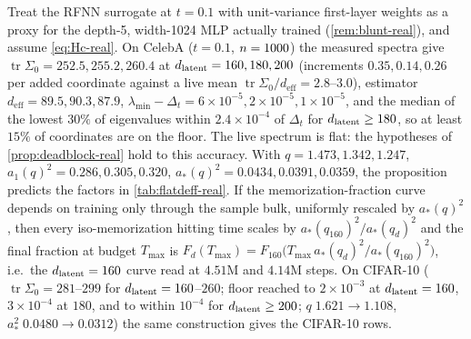 \begin{corollary}\label{cor:flatdeff-real}
Treat the RFNN surrogate at $t=0.1$ with unit-variance first-layer weights as a proxy for the depth-5, width-1024 MLP actually trained (\cref{rem:blunt-real}), and assume \eqref{eq:Hc-real}. On CelebA ($t=0.1$, $n=1000$) the measured spectra give $\operatorname{tr}\Sigma_0=252.5,255.2,260.4$ at $d_{\mathrm{latent}}=160,180,200$ (increments $0.35,0.14,0.26$ per added coordinate against a live mean $\operatorname{tr}\Sigma_0/d_{\mathrm{eff}}=2.8$--$3.0$), estimator $d_{\mathrm{eff}}=89.5,90.3,87.9$, $\lambda_{\min}-\Delta_t=6\times10^{-5},2\times10^{-5},1\times10^{-5}$, and the median of the lowest $30\%$ of eigenvalues within $2.4\times10^{-4}$ of $\Delta_t$ for $d_{\mathrm{latent}}\ge180$, so at least $15\%$ of coordinates are on the floor. The live spectrum is flat: the hypotheses of \cref{prop:deadblock-real} hold to this accuracy. With $q=1.473,1.342,1.247$, $a_1(q)^2=0.286,0.305,0.320$, $a_\ast(q)^2=0.0434,0.0391,0.0359$, the proposition predicts the factors in \cref{tab:flatdeff-real}. If the memorization-fraction curve depends on training only through the sample bulk, uniformly rescaled by $a_\ast(q)^2$, then every iso-memorization hitting time scales by $a_\ast(q_{160})^2/a_\ast(q_d)^2$ and the final fraction at budget $T_{\max}$ is $F_d(T_{\max})=F_{160}\big(T_{\max}\,a_\ast(q_d)^2/a_\ast(q_{160})^2\big)$, i.e.\ the $d_{\mathrm{latent}}=160$ curve read at $4.51$M and $4.14$M steps. On CIFAR-10 ($\operatorname{tr}\Sigma_0=281$--$299$ for $d_{\mathrm{latent}}=160$--$260$; floor reached to $2\times10^{-3}$ at $d_{\mathrm{latent}}=160$, $3\times10^{-4}$ at $180$, and to within $10^{-4}$ for $d_{\mathrm{latent}}\ge200$; $q\;1.621\to1.108$, $a_\ast^2\;0.0480\to0.0312$) the same construction gives the CIFAR-10 rows.
\end{corollary}


